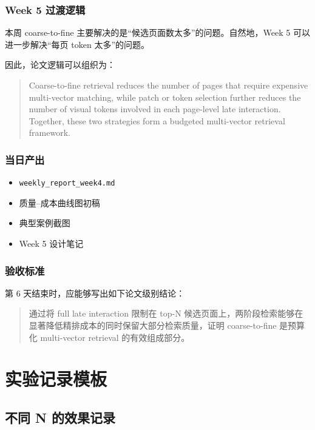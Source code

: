 \documentclass[UTF8,a4paper,12pt]{ctexart}
\begin{document}
	\subsubsection*{Week 5 过渡逻辑}
	
	本周 coarse-to-fine 主要解决的是“候选页面数太多”的问题。自然地，Week 5 可以进一步解决“每页 token 太多”的问题。
	
	因此，论文逻辑可以组织为：
	
	\begin{quote}
		Coarse-to-fine retrieval reduces the number of pages that require expensive multi-vector matching, while patch or token selection further reduces the number of visual tokens involved in each page-level late interaction. Together, these two strategies form a budgeted multi-vector retrieval framework.
	\end{quote}
	
	\subsubsection*{当日产出}
	
	\begin{itemize}[leftmargin=2em]
		\item \texttt{weekly\_report\_week4.md}
		\item 质量--成本曲线图初稿
		\item 典型案例截图
		\item Week 5 设计笔记
	\end{itemize}
	
	\subsubsection*{验收标准}
	
	第 6 天结束时，应能够写出如下论文级别结论：
	
	\begin{quote}
		通过将 full late interaction 限制在 top-N 候选页面上，两阶段检索能够在显著降低精排成本的同时保留大部分检索质量，证明 coarse-to-fine 是预算化 multi-vector retrieval 的有效组成部分。
	\end{quote}
	
	\section{实验记录模板}
	
	\subsection{不同 N 的效果记录}
	
\end{document}

